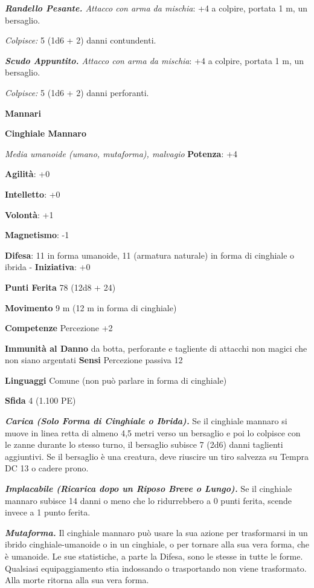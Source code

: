 \begin{multicols}{2}
\emph{\textbf{Randello Pesante.} Attacco con arma da mischia}: +4 a
colpire, portata 1 m, un bersaglio.

\emph{Colpisce:} 5 (1d6 + 2) danni contundenti.

\emph{\textbf{Scudo Appuntito.} Attacco con arma da mischia}: +4 a
colpire, portata 1 m, un bersaglio.

\emph{Colpisce:} 5 (1d6 + 2) danni perforanti.



\textbf{Mannari}

\textbf{Cinghiale Mannaro}

\emph{Media umanoide (umano, mutaforma), malvagio}
\textbf{Potenza}: +4

\textbf{Agilità}: +0

\textbf{Intelletto}: +0

\textbf{Volontà}: +1

\textbf{Magnetismo}: -1

\textbf{Difesa}: 11 in forma umanoide, 11 (armatura naturale) in
forma di cinghiale o ibrida  - \textbf{Iniziativa}: +0

\textbf{Punti Ferita} 78 (12d8 + 24)

\textbf{Movimento} 9 m (12 m in forma di cinghiale)

\textbf{Competenze} Percezione +2

\textbf{Immunità al Danno} da botta, perforante e tagliente di
attacchi non magici che non siano argentati \textbf{Sensi} Percezione
passiva 12

\textbf{Linguaggi} Comune (non può parlare in forma di cinghiale)

\textbf{Sfida} 4 (1.100 PE)\smallskip

\emph{\textbf{Carica (Solo Forma di Cinghiale o Ibrida).}} Se il
cinghiale mannaro si muove in linea retta di almeno 4,5 metri verso un
bersaglio e poi lo colpisce con le zanne durante lo stesso turno, il
bersaglio subisce 7 (2d6) danni taglienti aggiuntivi. Se il bersaglio è
una creatura, deve riuscire un tiro salvezza su Tempra DC 13 o cadere
prono.

\emph{\textbf{Implacabile (Ricarica dopo un Riposo Breve o Lungo).}} Se
il cinghiale mannaro subisce 14 danni o meno che lo ridurrebbero a 0
punti ferita, scende invece a 1 punto ferita.

\emph{\textbf{Mutaforma.}} Il cinghiale mannaro può usare la sua azione
per trasformarsi in un ibrido cinghiale-umanoide o in un cinghiale, o
per tornare alla sua vera forma, che è umanoide. Le sue statistiche, a
parte la Difesa, sono le stesse in tutte le forme. Qualsiasi equipaggiamento
stia indossando o trasportando non viene trasformato. Alla morte ritorna
alla sua vera forma.


\end{multicols}
